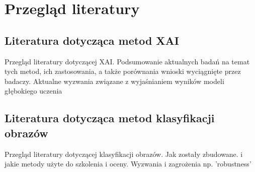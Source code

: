 
\chapter*{Przegląd literatury}

\section*{Literatura dotycząca metod XAI}
Przegląd literatury dotyczącej XAI.
Podsumowanie aktualnych badań na temat tych metod, ich zastosowania, a także porównania wnioski wyciągnięte przez badaczy.
Aktualne wyzwania związane z wyjaśnianiem wyników modeli głębokiego uczenia

\section*{Literatura dotycząca metod klasyfikacji obrazów}
Przegląd literatury dotyczącej klasyfikacji obrazów.
Jak zostały zbudowane. i jakie metody użyte do szkolenia i oceny.
Wyzwania i zagrożenia np. 'robustness'
